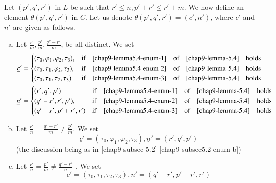\subsection{}\label{chap9-subsec-5.5}
Let $(p',q',r')$ in $L$ be such that $ r' \leq n, p' +r' \leq r' +m$. We now define an element $\theta(p',q',r')$ in $C$. Let us denote $\theta(p',q',r') = (\underline{c}', \underline{n}')$, where $\underline{c}'$ and $\underline{n}'$ are given as follows.
\begin{enumerate}[(a)]
\item Let $\frac{r'}{m}, \frac{p'}{m}, \frac{q'-r'}{m}$, be all distinct. We set\label{chap9-subsec5.5-enum-a}
\begin{align*}
\underline{c}'&=
\begin{cases}
(\tau_{0}, \varphi_{1}, \varphi_{2}, \tau_{3}),& \text{if}\quad \eqref{chap9-lemma5.4-enum-1}\quad \text{of}\quad \ref{chap9-lemma-5.4}\quad \text{holds}\\
(\tau_{0}, \tau_{1}, \varphi_{2}, \tau_{3}), & \text{if}\quad \eqref{chap9-lemma5.4-enum-2}\quad \text{of}\quad \ref{chap9-lemma-5.4}\quad \text{holds}\\
(\tau_{0}, \tau_{1}, \tau_{2}, \tau_{3}) & \text{if}\quad \eqref{chap9-lemma5.4-enum-3}\quad \text{of}\quad \ref{chap9-lemma-5.4}\quad \text{holds}
\end{cases}\\
\underline{n}' &=
\begin{cases}
(r', q',p')  & \text{if}\quad \eqref{chap9-lemma5.4-enum-1}\quad \text{of}\quad \ref{chap9-lemma-5.4}\quad \text{holds}\\
(q'-r',r',p'), & \text{if}\quad \eqref{chap9-lemma5.4-enum-2}\quad \text{of}\quad \ref{chap9-lemma-5.4}\quad \text{holds}\\
(q'-r', p'+r',r')& \text{if}\quad \eqref{chap9-lemma5.4-enum-3}\quad \text{of}\quad \ref{chap9-lemma-5.4}\quad \text{holds}
\end{cases}
\end{align*}

\item Let $\frac{r'}{n} = \frac{q'-r'}{m}\neq \frac{p'}{m}$. We set\label{chap9-subsec5.5-enum-b}
$$
\underline{c}' = (\tau_{0}, \varphi_{1}, \varphi_{2}, \tau_{3}), \underline{n}'= (r',q', p')
$$
(the discussion being as in \ref{chap9-subsec-5.2} \eqref{chap9-subsec5.2-enum-b})

\item Let $\frac{r'}{n} = \frac{p'}{m} \neq \frac{q'-r'}{n}$ . We set\label{chap9-subsec5.5-enum-c}
$$
\underline{c}' = (\tau_{0}, \tau_{1}, \tau_{2}, \tau_{3}), n' = (q'-r',p'+r', r')
$$


\end{enumerate}
